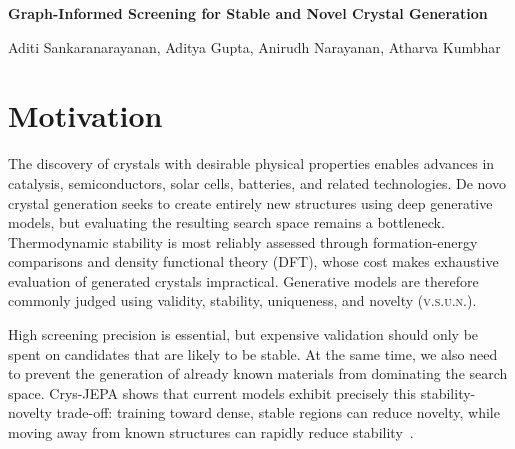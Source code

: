 \documentclass[10pt,a4paper]{article}
\newcommand{\vsun}{\textsc{v.s.u.n.}}
\newcommand{\sectionrule}{\vspace{-1.5pt}{\color{navy!35}\hrule height .35pt}\vspace{1.2pt}}
\begin{document}
\fontsize{9.6}{11.1}\selectfont

\begin{center}
  {\color{navy}\bfseries\fontsize{16.2}{18}\selectfont
  Graph-Informed Screening for Stable and Novel Crystal Generation}\par
  \vspace{2.5pt}
  {\large{Aditi Sankaranarayanan, Aditya Gupta, Anirudh Narayanan, Atharva Kumbhar}}
\end{center}

\smallskip
\section*{Motivation}
\sectionrule
The discovery of crystals with desirable physical properties enables advances in catalysis, semiconductors, solar cells, batteries, and related technologies. De novo crystal generation seeks to create entirely new structures using deep generative models, but evaluating the resulting search space remains a bottleneck. Thermodynamic stability is most reliably assessed through formation-energy comparisons and density functional theory (DFT), whose cost makes exhaustive evaluation of generated crystals impractical. Generative models are therefore commonly judged using validity, stability, uniqueness, and novelty (\vsun).

High screening precision is essential, but expensive validation should only be spent on candidates that are likely to be stable. At the same time, we also need to prevent the generation of already known materials from dominating the search space. Crys-JEPA shows that current models exhibit precisely this stability-novelty trade-off: training toward dense, stable regions can reduce novelty, while moving away from known structures can rapidly reduce stability~\cite{liu2026crysjepa}.
\end{document}
